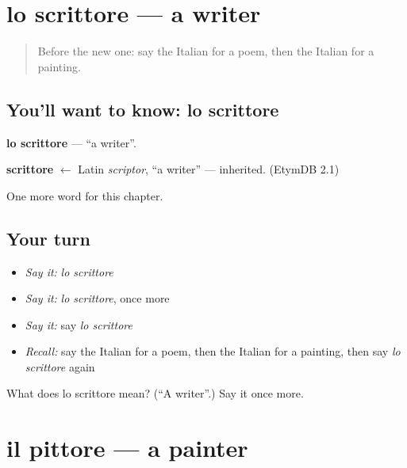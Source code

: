\section[lo scrittore]{lo scrittore — a writer}

\label{lesson:IT-C223-scrittore}



\begin{quote}
Before the new one: say the Italian for a poem, then the Italian for a painting.
\end{quote}

\subsection*{You'll want to know: lo scrittore}
\textbf{lo scrittore} — \textquotedblleft{}a writer\textquotedblright{}.

\begin{cousinweb}
\textbf{scrittore} $\leftarrow$ Latin \emph{scriptor}, \textquotedblleft{}a writer\textquotedblright{} — inherited. (EtymDB 2.1)
\end{cousinweb}

\begin{grammarlens}[title={What you've built}]
One more word for this chapter.
\end{grammarlens}

\subsection*{Your turn}
\begin{itemize}
\raggedright
  \item \emph{Say it:} \emph{lo scrittore}
  \item \emph{Say it:} \emph{lo scrittore}, once more
  \item \emph{Say it:} say \emph{lo scrittore}
  \item \emph{Recall:} say the Italian for a poem, then the Italian for a painting, then say \emph{lo scrittore} again
\end{itemize}

\begin{tcolorbox}[breakable,colback=teal!4,colframe=teal!35!black,title={Before you move on}]
What does lo scrittore mean? (\textquotedblleft{}A writer\textquotedblright{}.) Say it once more.
\end{tcolorbox}
\section[il pittore]{il pittore — a painter}

